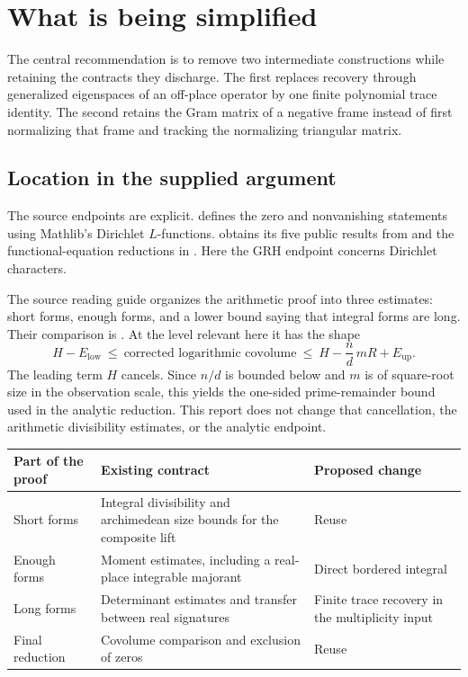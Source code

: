 \section{What is being simplified}\label{sec:scope}

The central recommendation is to remove two intermediate constructions while retaining
the contracts they discharge. The first replaces recovery through generalized eigenspaces
of an off-place operator by one finite polynomial trace identity. The second retains the
Gram matrix of a negative frame instead of first normalizing that frame and tracking the
normalizing triangular matrix.

\subsection{Location in the supplied argument}

The source endpoints are explicit.  defines the zero and
nonvanishing statements using Mathlib's Dirichlet \(L\)-functions.
 obtains its five public results from  and the
functional-equation reductions in .
Here the GRH endpoint concerns Dirichlet characters.

The source reading guide organizes the arithmetic proof into three estimates:
short forms, enough forms, and a lower bound saying that integral forms are long.
Their comparison is .
At the level relevant here it has the shape
\[
 H-E_{\mathrm{low}}
 \ \leq\ \text{corrected logarithmic covolume}
 \ \leq\ H-\frac{n}{d}\,mR+E_{\mathrm{up}}.
\]
The leading term \(H\) cancels. Since \(n/d\) is bounded below and
\(m\) is of square-root size in the observation scale, this yields the one-sided
prime-remainder bound used in the analytic reduction. This report does not change
that cancellation, the arithmetic divisibility estimates, or the analytic endpoint.

\begin{center}
\begin{tabularx}{\linewidth}{@{}L{.23\linewidth}YL{.24\linewidth}@{}}
\toprule
Part of the proof & Existing contract & Proposed change\\
\midrule
Short forms & Integral divisibility and archimedean size bounds for the composite lift & Reuse\\
Enough forms & Moment estimates, including a real-place integrable majorant & Direct bordered integral\\
Long forms & Determinant estimates and transfer between real signatures & Finite trace recovery in the multiplicity input\\
Final reduction & Covolume comparison and exclusion of zeros & Reuse\\
\bottomrule
\end{tabularx}
\end{center}

